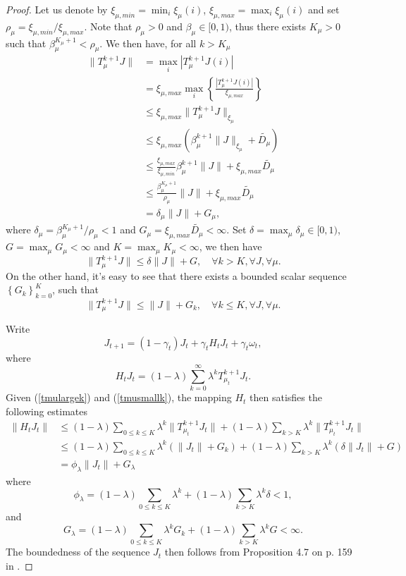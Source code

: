 \documentclass[12pt,a4paper]{amsart}
\numberwithin{equation}{section}
\theoremstyle{plain}
\theoremstyle{definition}
\begin{document}
\begin{proof}
	Let us denote by $\xi_{\mu, min} = \min_{i} \xi_{\mu}(i)$, $\xi_{\mu, max} = \max_{i} \xi_{\mu}(i)$ and set $\rho_{\mu} = \xi_{\mu, min} / \xi_{\mu, max}$. Note that $\rho_{\mu} > 0$ and $\beta_{\mu} \in [0, 1)$, thus there exists $K_{\mu} > 0$ such that $\beta_{\mu}^{K_{\mu} +1 } < \rho_{\mu}$.  We then have, for all $k > K_{\mu}$
	$$
	\begin{aligned}
	\|T_{\mu}^{k+1}J\| & = \max_{i} |T_{\mu}^{k+1} J(i)| \\
	&  = \xi_{\mu, max} \max_{i} \left\{\frac{|T_{\mu}^{k+1}J(i)|}{\xi_{\mu, max}} \right\} \\
	& \le \xi_{\mu, max} \|T_{\mu}^{k+1}J\|_{\xi_{\mu}} \\
	& \le \xi_{\mu, max} \left( \beta_{\mu}^{k+1} \|J\|_{\xi_{\mu}}  + \tilde{D_{\mu}} \right) \\
	& \le \frac{\xi_{\mu, max}}{\xi_{\mu, min}} \beta_{\mu}^{k+1} \|J\| + \xi_{\mu, max} \tilde{D_{\mu}} \\
	& \le \frac{\beta_{\mu}^{K_{\mu} + 1}}{\rho_{\mu}} \|J\| + \xi_{\mu, max} \tilde{D_{\mu}} \\
	& = \delta_{\mu} \|J\| + G_{\mu},
	\end{aligned}
	$$
	where $\delta_{\mu} = \beta_{\mu}^{K_{\mu}+1} / \rho_{\mu} < 1$ and $G_{\mu} = \xi_{\mu, max} \tilde{D_{\mu}} < \infty$.  Set $\delta = \max_{\mu} \delta_{\mu} \in [0, 1)$, $G = \max_{\mu} G_{\mu} < \infty$ and $K= \max_{\mu} K_{\mu}  < \infty$, we then have
	\begin{equation} \label{tmulargek}
	\|T_{\mu}^{k+1} J\| \le \delta \|J\| + G, \quad \forall k > K, \forall J, \forall \mu. 
	\end{equation}
	On the other hand, it's easy to see that there exists a bounded scalar sequence $\left\{G_k\right\}_{k=0}^{K}$, such that 
	\begin{equation} \label{tmusmallk}
		\|T_{\mu}^{k+1} J\| \le \|J\| + G_k, \quad \forall k \le K, \forall J,  \forall \mu. 
	\end{equation}
	
	Write
	$$
	J_{t+1 } = (1 -\gamma_t) J_t + \gamma_t H_t J_t + \gamma_t \omega_t,
	$$
	where 
	$$
	H_t J_t =(1-\lambda) \sum_{k=0}^{\infty} \lambda^k T_{\mu_t}^{k+1} J_t.  
	$$
	Given (\ref{tmulargek}) and (\ref{tmusmallk}), the mapping $H_t$ then satisfies the following estimates
	$$
	\begin{aligned}
		\|H_t J_t\| & \le (1-\lambda)\sum_{0\le k \le K} \lambda^k \|T_{\mu_t}^{k+1}J_t\| + (1-\lambda)\sum_{ k > K} \lambda^k \|T_{\mu_t}^{k+1}J_t\| \\
		& \le (1-\lambda)\sum_{0\le k \le K} \lambda^k \left(\|J_t\| + G_k\right) + (1-\lambda)\sum_{ k > K} \lambda^k \left(\delta\|J_t\| + G \right) \\
		& = \phi_{\lambda} \|J_t\| + G_{\lambda}
	\end{aligned}
	$$
	where 
	$$
	\phi_{\lambda} = (1-\lambda)\sum_{0\le k \le K} \lambda^k + (1-\lambda)\sum_{ k > K} \lambda^k \delta < 1,
	$$
	and 
	$$
	G_{\lambda} = (1-\lambda)\sum_{0\le k \le K} \lambda^k  G_k + (1-\lambda)\sum_{ k > K} \lambda^k G < \infty. 
	$$
	The boundedness of the sequence $J_t$ then follows from Proposition 4.7 on p. 159 in \cite{BertsekasTsitsiklis96}. 
\end{proof}
\end{document}
